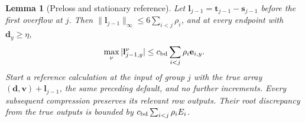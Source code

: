 \documentclass[11pt]{article}
\numberwithin{equation}{section}
\newtheorem{lemma}[theorem]{Lemma}
\theoremstyle{definition}
\theoremstyle{remark}
\begin{document}
\begin{lemma}[Preloss and stationary reference]
\label{lem:buf-reference}
Let ${\mathbf{l}}_{j-1}={\mathbf{t}}_{j-1}-{\mathbf{s}}_{j-1}$ before the first overflow at $j$.
Then $\|{\mathbf{l}}_{j-1}\|_\infty\leq6\sum_{i<j}\rho_i$, and at every endpoint
with ${\mathbf{d}}_y\geq\eta$,
\begin{equation}
 \max_\nu|{\mathbf{l}}^{\nu}_{j-1,y}|
       \leq {c_{\rm bd}}\sum_{i<j}\rho_i \mathbf e_{i,y}.
 \label{eq:buf-preloss}
\end{equation}
Start a reference calculation at the input of group $j$ with the true
array $({\mathbf{d}},{\mathbf{v}})+{\mathbf{l}}_{j-1}$, the same preceding default, and no further
increments.  Every subsequent compression preserves its relevant row
outputs.  Their root discrepancy from the true outputs is bounded by
${c_{\rm bd}}\sum_{i<j}\rho_i {E_i}$.
\end{lemma}
\end{document}
